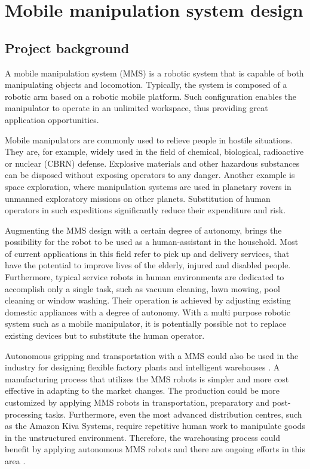 \chapter{Mobile manipulation system design}
\label{cha:mmsdesign}


\section{Project background}
\label{sec:background}

A mobile manipulation system (MMS) is a robotic system that is capable of both manipulating objects and locomotion. Typically, the system is composed of a robotic arm based on a robotic mobile platform. Such configuration enables the manipulator to operate in an unlimited workspace, thus providing great application opportunities.

Mobile manipulators are commonly used to relieve people in hostile situations. They are, for example, widely used in the field of chemical, biological, radioactive or nuclear (CBRN) defense. Explosive materials and other hazardous substances can be disposed without exposing operators to any danger. Another example is space exploration, where manipulation systems are used in planetary rovers in unmanned exploratory missions on other planets. Substitution of human operators in such expeditions significantly reduce their expenditure and risk.

Augmenting the MMS design with a certain degree of autonomy, brings the possibility for the robot to be used as a human-assistant in the household. Most of current applications in this field refer to pick up and delivery services, that have the potential to improve lives of the elderly, injured and disabled people. Furthermore, typical service robots in human environments are dedicated to accomplish only a single task, such as vacuum cleaning, lawn mowing, pool cleaning or window washing. Their operation is achieved by adjusting existing domestic appliances with a degree of autonomy. With a multi purpose robotic system such as a mobile manipulator, it is potentially possible not to replace existing devices but to substitute the human operator. 

Autonomous gripping and transportation with a MMS could also be used in the industry for designing flexible factory plants and intelligent warehouses \cite{aimm}. A manufacturing process that utilizes the MMS robots is simpler and more cost effective in adapting to the market changes. The production could be more customized by applying MMS robots in transportation, preparatory and post-processing tasks. Furthermore, even the most advanced distribution centres, such as the Amazon Kiva Systems, require repetitive human work to manipulate goods in the unstructured environment. Therefore, the warehousing process could benefit by applying autonomous MMS robots and there are ongoing efforts in this area \cite{amazonchallenge}.

